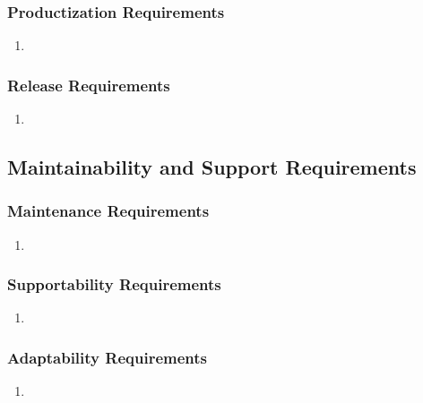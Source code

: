 \documentclass[]{article}
\begin{document}
\subsubsection{Productization Requirements}
\label{ssub:productization_requirements}
\begin{enumerate}[{OE-P}1. ]
	\item 
\end{enumerate}

\subsubsection{Release Requirements}
\label{ssub:release_requirements}
\begin{enumerate}[{OE-R}1. ]
	\item 
\end{enumerate}


\subsection{Maintainability and Support Requirements}
\label{sub:maintainability_and_support_requirements}

\subsubsection{Maintenance Requirements}
\label{ssub:maintenance_requirements}
\begin{enumerate}[{MS-M}1. ]
	\item 
\end{enumerate}

\subsubsection{Supportability Requirements}
\label{ssub:supportability_requirements}
\begin{enumerate}[{MS-S}1. ]
	\item 
\end{enumerate}

\subsubsection{Adaptability Requirements}
\label{ssub:adaptability_requirements}
\begin{enumerate}[{MS-A}1. ]
	\item 
\end{enumerate}
\end{document}
